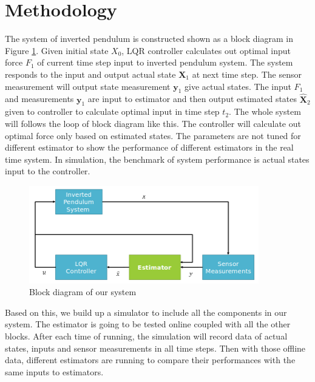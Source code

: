 \documentclass{article}
\newcommand{\matr}[1]{\bm{#1}}     %
\begin{document}
\section{Methodology} 
The system of inverted pendulum is constructed shown as a block diagram in Figure \ref{fig:block_diagram}. Given initial state $X_0$, LQR controller  calculates out optimal input force $F_1$ of current time step input to inverted pendulum system. The system responds to the input and output actual state $\matr{X}_1$ at next time step. The sensor measurement will output state measurement $\matr{y}_1$ give actual states. The input $F_1$ and measurements $\matr{y}_1$ are input to estimator and then output estimated states $\matr{\hat{X}}_2$ given to controller to calculate optimal input in time step $t_2$. The whole system will follows the loop of block diagram like this. The controller will calculate out optimal force only based on estimated states. The parameters are not tuned for different estimator to show the performance of different estimators in the real time system. In simulation, the benchmark of system performance is actual states input to the controller.
\begin{figure}[h!]
	\centering
	\includegraphics[width=10cm,keepaspectratio]{SystemArchitecture.png}
	\caption{Block diagram of our system}
	\label{fig:block_diagram}
\end{figure}

Based on this, we build up a simulator to include all the components in our system. The estimator is going to be tested online coupled with all the other blocks. After each time of running, the simulation will record data of actual states, inputs and sensor measurements in all time steps. Then with those offline data, different estimators are running to compare their performances with the same inputs to estimators. 
\end{document}
